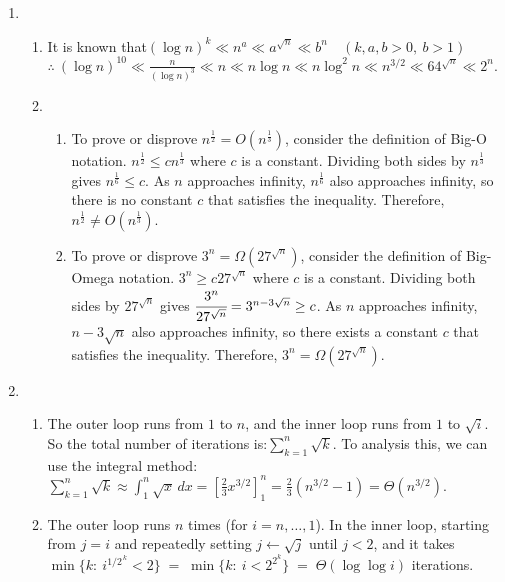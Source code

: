 \documentclass[12pt,a4paper]{article}
\begin{document}
\begin{enumerate}
    \item 
    \begin{enumerate}
        \item It is known that$(\log n)^k \ll n^a \ll a^{\sqrt n} \ll b^n \quad (k,a,b>0,\ b>1)$\\$\therefore\ (\log n)^{10} \ll \frac{n}{(\log n)^3} \ll n \ll n\log n \ll n\log^2 n \ll n^{3/2} \ll 64^{\sqrt n} \ll 2^n.$

        \item
        \begin{enumerate}
            \item {} To prove or disprove $n^\frac{1}{2} = O(n^\frac{1}{3})$, consider the definition of Big-O notation. $n^\frac{1}{2}\le cn^\frac{1}{3}$ where $c$ is a constant. Dividing both sides by $n^\frac{1}{3}$ gives $n^\frac{1}{6}\le c$. As $n$ approaches infinity, $n^\frac{1}{6}$ also approaches infinity, so there is no constant $c$ that satisfies the inequality. Therefore, $n^\frac{1}{2} \neq O(n^\frac{1}{3})$.
            \item {} To prove or disprove $3^n = \Omega(27^{\sqrt{n}})$, consider the definition of Big-Omega notation. $3^n\ge c27^{\sqrt{n}}$ where $c$ is a constant. Dividing both sides by $27^{\sqrt{n}}$ gives $\cfrac{3^n}{27^{\sqrt{n}}}=3^{n-3\sqrt{n}}\ge c$. As $n$ approaches infinity, $n-3\sqrt{n}$ also approaches infinity, so there exists a constant $c$ that satisfies the inequality. Therefore, $3^n = \Omega(27^{\sqrt{n}})$.
        \end{enumerate}
    \end{enumerate}
    \item
    \begin{enumerate}
        \item The outer loop runs from $1$ to $n$, and the inner loop runs from $1$ to $\sqrt{i}$. So the total number of iterations is:$\displaystyle\sum^n_{k=1}{\sqrt{k}}$. To analysis this, we can use the integral method:$\displaystyle\sum^n_{k=1}{\sqrt{k}} \approx \int_1^n \sqrt{x} \, dx = \left[ \frac{2}{3} x^{3/2} \right]_1^n = \frac{2}{3} (n^{3/2} - 1) = \Theta(n^{3/2})$.
        \item The outer loop runs $n$ times (for $i=n,\dots,1$). In the inner loop, starting from $j=i$ and repeatedly setting $j\leftarrow\sqrt{j}$ until $j<2$,
        and it takes
        $\min\{k:\ i^{1/2^{\,k}}<2\}\;=\;\min\{k:\ i<2^{2^{k}}\}\;=\;\Theta(\log\log i)$
        iterations. \\

\end{enumerate}
\end{enumerate}
\end{document}
